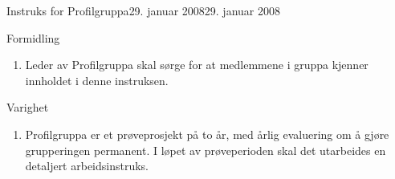 \begin{instruks}{Instruks for Profilgruppa}{29. januar 2008}{29. januar 2008}
    \begin{instruksledd}{Formidling}
        \begin{enumerate}
            \item Leder av Profilgruppa skal sørge for at medlemmene i gruppa kjenner innholdet i denne instruksen.
        \end{enumerate}
    \end{instruksledd}

    \begin{instruksledd}{Varighet}
        \begin{enumerate}
            \item Profilgruppa er et prøveprosjekt på to år, med årlig evaluering om å gjøre grupperingen permanent. I løpet av
prøveperioden skal det utarbeides en detaljert arbeidsinstruks.
        \end{enumerate}
    \end{instruksledd}
    
\end{instruks}
